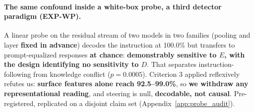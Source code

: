 \paragraph{The same confound inside a white-box probe, a third detector paradigm (EXP-WP).} A linear probe on the residual stream of two models in two families (pooling and layer \textbf{fixed in advance}) decodes the instruction at 100.0\% but transfers to prompt-equalized responses \textbf{at chance}: \textbf{demonstrably sensitive to $E$, with the design identifying no sensitivity to $D$}. That separates instruction-following from knowledge conflict ($p\!=\!0.0005$). Criterion 3 applied reflexively refutes us: \textbf{surface features alone reach 92.5--99.0\%}, so \textbf{we withdraw any representational reading}, and steering is null, \textbf{decodable, not causal}. Pre-registered, replicated on a disjoint claim set (Appendix~\ref{app:probe_audit}).

